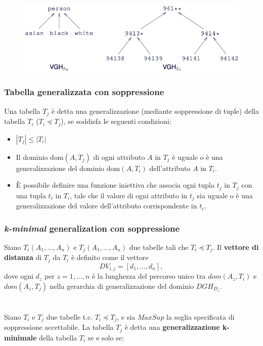 \documentclass{report}
\begin{document}
\begin{figure}[ht]
    \centering
    \includegraphics[width=1\linewidth]{images/valuegen.png}
\end{figure}

\subsubsection{Tabella generalizzata con soppressione}
Una tabella \( T_j \) è detta una generalizzazione (mediante soppressione di tuple) della tabella \( T_i \) (\( T_i \preceq T_j \)), se soddisfa le seguenti condizioni:

\begin{itemize}
    \item \( |T_j| \leq |T_i| \)
    \item Il dominio \( \text{dom}(A,T_j) \) di ogni attributo \( A \) in \( T_j \) è uguale o è una generalizzazione del dominio \( \text{dom}(A,T_i) \) dell'attributo \( A \) in \( T_i \).
    \item È possibile definire una funzione iniettiva che associa ogni tupla \( t_j \) in \( T_j \) con una tupla \( t_i \) in \( T_i \), tale che il valore di ogni attributo in \( t_j \) sia uguale o è una generalizzazione del valore dell'attributo corrispondente in \( t_i \).
\end{itemize}

\newpage
\subsubsection{\textit{k-minimal} generalization con soppressione}
Siano \( T_i(A_1, \ldots, A_n) \) e \( T_j(A_1, \ldots, A_n) \) due tabelle tali che \( T_i \preceq T_j \). Il \textbf{vettore di distanza} di \( T_j \) da \( T_i \) è definito come il vettore
\[
DV_{i,j} = [d_1, \ldots, d_n],
\] 
dove ogni \( d_z \) per \( z = 1, \ldots, n \) è la lunghezza del percorso unico tra \( dom(A_z, T_i) \) e \( dom(A_z, T_j) \) nella gerarchia di generalizzazione del dominio \( DGH_{D_z} \).
\\\\\\
Siano \( T_i \) e \( T_j \) due tabelle t.c. \( T_i \preceq T_j \), e sia \( MaxSup \) la soglia specificata di soppressione accettabile. La tabella \( T_j \) è detta una \textbf{generalizzazione k-minimale} della tabella \( T_i \) se e solo se:
\end{document}
